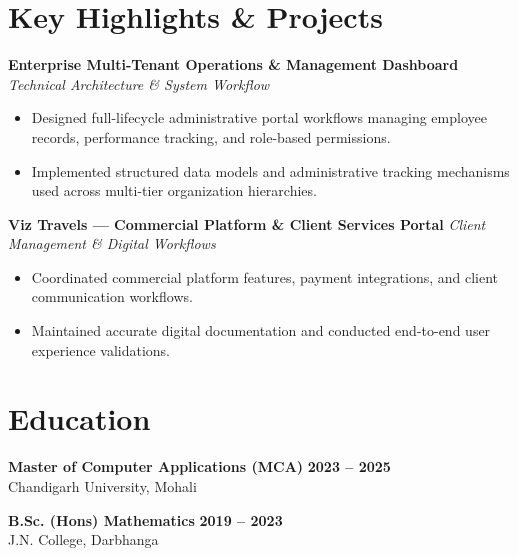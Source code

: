 \documentclass[a4paper,10pt]{article}
\begin{document}
\section*{Key Highlights \& Projects}

\textbf{Enterprise Multi-Tenant Operations \& Management Dashboard}
\hfill
\textit{Technical Architecture \& System Workflow}

\begin{itemize}

    \item Designed full-lifecycle administrative portal workflows managing employee records, performance tracking, and role-based permissions.

    \item Implemented structured data models and administrative tracking mechanisms used across multi-tier organization hierarchies.

\end{itemize}


\textbf{Viz Travels --- Commercial Platform \& Client Services Portal}
\hfill
\textit{Client Management \& Digital Workflows}

\begin{itemize}

    \item Coordinated commercial platform features, payment integrations, and client communication workflows.

    \item Maintained accurate digital documentation and conducted end-to-end user experience validations.

\end{itemize}

\section*{Education}

\textbf{Master of Computer Applications (MCA)}
\hfill
\textbf{2023 -- 2025}
\\
Chandigarh University, Mohali

\vspace{3pt}

\textbf{B.Sc. (Hons) Mathematics}
\hfill
\textbf{2019 -- 2023}
\\
J.N. College, Darbhanga

\end{document}
